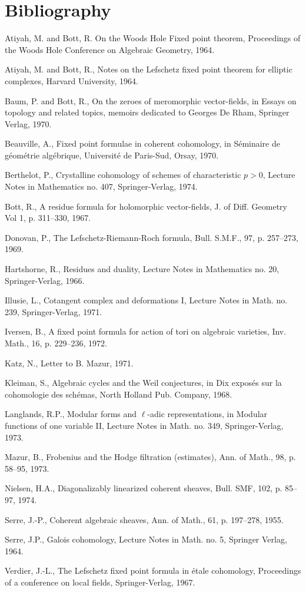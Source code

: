 \documentclass[11pt]{article}
\begin{document}
\section*{Bibliography}
\begin{enumerate}[label={[\arabic*]},leftmargin=3.5em]
\item Atiyah, M. and Bott, R. On the Woods Hole Fixed point theorem, Proceedings of the Woods Hole Conference on Algebraic Geometry, 1964.
\item Atiyah, M. and Bott, R., Notes on the Lefschetz fixed point theorem for elliptic complexes, Harvard University, 1964.
\item Baum, P. and Bott, R., On the zeroes of meromorphic vector-fields, in Essays on topology and related topics, memoirs dedicated to Georges De Rham, Springer Verlag, 1970.
\item Beauville, A., Fixed point formulae in coherent cohomology, in Séminaire de géométrie algébrique, Université de Paris-Sud, Orsay, 1970.
\item Berthelot, P., Crystalline cohomology of schemes of characteristic $p>0$, Lecture Notes in Mathematics no. 407, Springer-Verlag, 1974.
\item Bott, R., A residue formula for holomorphic vector-fields, J. of Diff. Geometry Vol 1, p. 311--330, 1967.
\item Donovan, P., The Lefschetz-Riemann-Roch formula, Bull. S.M.F., 97, p. 257--273, 1969.
\item Hartshorne, R., Residues and duality, Lecture Notes in Mathematics no. 20, Springer-Verlag, 1966.
\item Illusie, L., Cotangent complex and deformations I, Lecture Notes in Math. no. 239, Springer-Verlag, 1971.
\item Iversen, B., A fixed point formula for action of tori on algebraic varieties, Inv. Math., 16, p. 229--236, 1972.
\item Katz, N., Letter to B. Mazur, 1971.
\item Kleiman, S., Algebraic cycles and the Weil conjectures, in Dix exposés sur la cohomologie des schémas, North Holland Pub. Company, 1968.
\item Langlands, R.P., Modular forms and $\ell$-adic representations, in Modular functions of one variable II, Lecture Notes in Math. no. 349, Springer-Verlag, 1973.
\item Mazur, B., Frobenius and the Hodge filtration (estimates), Ann. of Math., 98, p. 58--95, 1973.
\item Nielsen, H.A., Diagonalizably linearized coherent sheaves, Bull. SMF, 102, p. 85--97, 1974.
\item Serre, J.-P., Coherent algebraic sheaves, Ann. of Math., 61, p. 197--278, 1955.
\item Serre, J.P., Galois cohomology, Lecture Notes in Math. no. 5, Springer Verlag, 1964.
\item Verdier, J.-L., The Lefschetz fixed point formula in étale cohomology, Proceedings of a conference on local fields, Springer-Verlag, 1967.
\end{enumerate}
\end{document}
